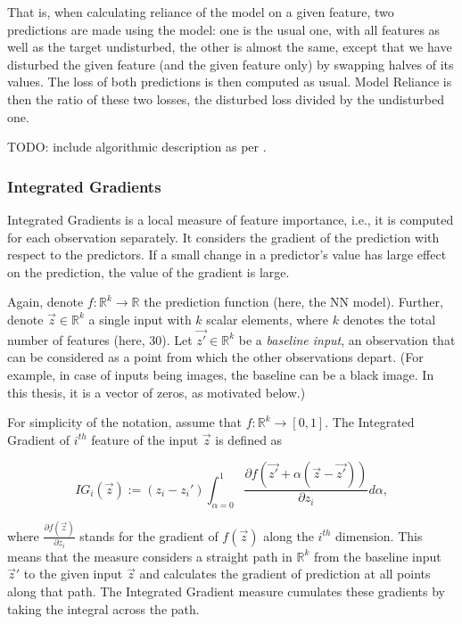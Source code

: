 			That is, when calculating reliance of the model on a given feature, two predictions are made using the model: one is the usual one, with all features as well as the target undisturbed, the other is almost the same, except that we have disturbed the given feature (and the given feature only) by swapping halves of its values. The loss of both predictions is then computed as usual. Model Reliance is then the ratio of these two losses, the disturbed loss divided by the undisturbed one.   
			
			TODO: include algorithmic description as per \cite{molnar2020interpretable}.
		
			
		\subsubsection{Integrated Gradients}
			Integrated Gradients \citep{sundararajan2017axiomatic} is a local measure of feature importance, i.e., it is computed for each observation separately. It considers the gradient of the prediction with respect to the predictors. If a small change in a predictor's value has large effect on the prediction, the value of the gradient is large.
			
			Again, denote $f: \mathbb{R}^k \rightarrow \mathbb{R}$ the prediction function (here, the NN model). Further, denote $\vec{z} \in  \mathbb{R}^k$ a single input with $k$ scalar elements, where $k$ denotes the total number of features (here, 30). Let $\vec{z'} \in  \mathbb{R}^k$ be a \textit{baseline input}, an observation that can be considered as a point from which the other observations depart. (For example, in case of inputs being images, the baseline can be a black image. In this thesis, it is a vector of zeros, as motivated below.) 
			
			For simplicity of the notation, assume that $f: \mathbb{R}^k \rightarrow [0,1]$. The Integrated Gradient of $i^{th}$ feature of the input $\vec{z}$ is defined as 
			
			\begin{equation*}
				IG_i(\vec{z}) := (z_i - z_i') \int_{\alpha=0}^{1} \frac{\partial f(\vec{z'} + \alpha(\vec{z}-\vec{z'}))}{\partial z_i}d\alpha,
			\end{equation*}
			
			where $\frac{\partial f(\vec{z})}{\partial z_i}$ stands for the gradient of $f(\vec{z})$ along the $i^{th}$ dimension. This means that the measure considers a straight path in $\mathbb{R}^k$ from the baseline input ${\vec{z}'}$ to the given input ${\vec{z}}$ and calculates the gradient of prediction at all points along that path. The Integrated Gradient measure cumulates these gradients by taking the integral across the path.  
			
